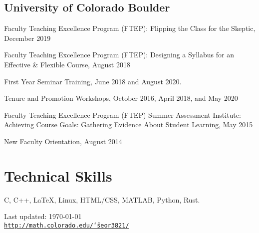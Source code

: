 \documentclass[letterpaper]{article}
\renewenvironment{itemize}{
  \begin{list}{}{
    \setlength{\leftmargin}{1em}
  }
}{
  \end{list}
}
\begin{document}
\subsection*{University of Colorado Boulder}
\begin{itemize}
	\item Faculty Teaching Excellence Program (FTEP): Flipping the Class for the Skeptic, December 2019
	\item Faculty Teaching Excellence Program (FTEP): Designing a Syllabus for an Effective \& Flexible Course, August 2018
	\item First Year Seminar Training, June 2018 and August 2020.  
	\item Tenure and Promotion Workshops, October 2016, April 2018, and May 2020 
	\item Faculty Teaching Excellence Program (FTEP) Summer Assessment Institute: Achieving Course Goals: Gathering Evidence About Student Learning, May 2015
	\item New Faculty Orientation, August 2014
\end{itemize}


\section*{Technical Skills}
\begin{itemize}
	\item C, C++, \LaTeX, Linux, HTML/CSS, MATLAB, Python, Rust.
\end{itemize}

\bigskip

\begin{center}
\begin{footnotesize}
Last updated: \today \\
\href{http://math.colorado.edu/~seor3821/}{\tt http://math.colorado.edu/\char`\~
seor3821/}
\end{footnotesize}
\end{center}
\end{document}
